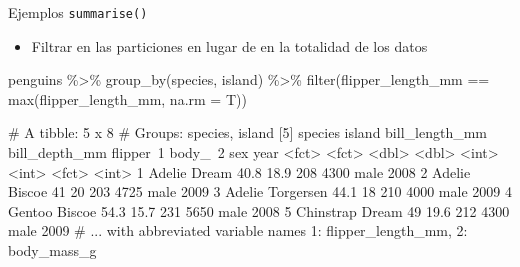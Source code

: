 \documentclass[
  ignorenonframetext,
  aspectratio=169]{beamer}
\newenvironment{Shaded}{\begin{snugshade}}{\end{snugshade}}
\newcommand{\AttributeTok}[1]{\textcolor[rgb]{0.77,0.63,0.00}{#1}}
\newcommand{\FunctionTok}[1]{\textcolor[rgb]{0.00,0.00,0.00}{#1}}
\newcommand{\NormalTok}[1]{#1}
\newcommand{\SpecialCharTok}[1]{\textcolor[rgb]{0.00,0.00,0.00}{#1}}
\providecommand{\tightlist}{%
  \setlength{\itemsep}{0pt}\setlength{\parskip}{0pt}}
\let\oldverbatim\verbatim
\let\endoldverbatim\endverbatim
\renewenvironment{verbatim}{\tiny\oldverbatim}{\endoldverbatim}
\begin{document}
\begin{frame}[fragile]{Ejemplos \texttt{summarise()}}
\protect\hypertarget{ejemplos-summarise-7}{}
\begin{itemize}
\tightlist
\item
  Filtrar en las particiones en lugar de en la totalidad de los datos
\end{itemize}

\begin{Shaded}
\begin{Highlighting}[]
\NormalTok{penguins }\SpecialCharTok{\%\textgreater{}\%} 
  \FunctionTok{group\_by}\NormalTok{(species, island) }\SpecialCharTok{\%\textgreater{}\%} 
  \FunctionTok{filter}\NormalTok{(flipper\_length\_mm }\SpecialCharTok{==} \FunctionTok{max}\NormalTok{(flipper\_length\_mm, }\AttributeTok{na.rm =}\NormalTok{ T))}
\end{Highlighting}
\end{Shaded}

\begin{verbatim}
# A tibble: 5 x 8
# Groups:   species, island [5]
  species   island    bill_length_mm bill_depth_mm flipper~1 body_~2 sex    year
  <fct>     <fct>              <dbl>         <dbl>     <int>   <int> <fct> <int>
1 Adelie    Dream               40.8          18.9       208    4300 male   2008
2 Adelie    Biscoe              41            20         203    4725 male   2009
3 Adelie    Torgersen           44.1          18         210    4000 male   2009
4 Gentoo    Biscoe              54.3          15.7       231    5650 male   2008
5 Chinstrap Dream               49            19.6       212    4300 male   2009
# ... with abbreviated variable names 1: flipper_length_mm, 2: body_mass_g
\end{verbatim}
\end{frame}
\end{document}
